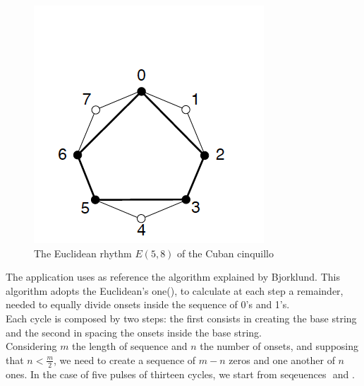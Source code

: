 \documentclass[main.tex]{subfiles}
\begin{document}
\begin{figure}[htbp]
\centering
\includegraphics{images/cuban_cinquillo.png}
\caption{The Euclidean rhythm $E(5,8)$ of the Cuban cinquillo}
\label{fig:1}
\end{figure}
The application uses as reference the algorithm explained by Bjorklund\cite{Bjorklund:2003:euclidean:rhythm}. This algorithm adopts the Euclidean's one(), to calculate at each step a remainder, needed to equally divide onsets inside the sequence of 0's and 1's.\\
Each cycle is composed by two steps: the first consists in creating the base string and the second in spacing the onsets inside the base string.\\
Considering \begin{math}m\end{math} the length of sequence and \begin{math}n\end{math} the number of onsets, and supposing that \begin{math}n<\frac{m}{2}\end{math}, we need to create a sequence of \begin{math}m-n\end{math} zeros and one another of \begin{math}n\end{math} ones. In the case of five pulses of thirteen cycles, we start from seqeuences \begin{math}[00000000]\end{math} and \begin{math}[11111]\end{math}.\\
\end{document}
